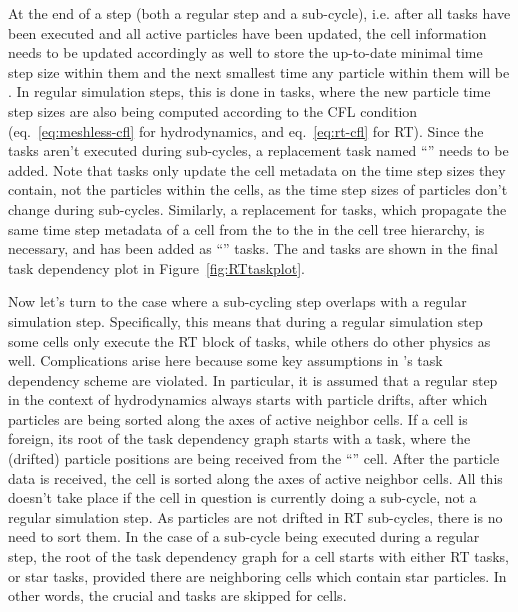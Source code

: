 At the end of a step (both a regular step and a sub-cycle), i.e. after all tasks have been executed
and all active particles have been updated, the cell information needs to be updated accordingly as
well to store the up-to-date minimal time step size within them and the next smallest time any
particle within them will be . In regular simulation steps, this is done in
 tasks, where the new particle time step sizes are also being computed according to
the CFL condition (eq.~\ref{eq:meshless-cfl} for hydrodynamics, and eq.~\ref{eq:rt-cfl} for RT).
Since the  tasks aren't executed during sub-cycles, a replacement task named
``'' needs to be added. Note that 
tasks only update the cell metadata on the time step sizes they contain, not the particles within
the cells, as the time step sizes of particles don't change during sub-cycles. Similarly, a
replacement for  tasks, which propagate the same time step metadata of a cell from
the  to the  in the cell tree hierarchy, is necessary, and has
been added as ``'' tasks. The   and
 tasks are shown in the final task dependency plot in
Figure~\ref{fig:RTtaskplot}.


Now let's turn to the case where a sub-cycling step overlaps with a regular simulation step.
Specifically, this means that during a regular simulation step some cells only execute the RT block
of tasks, while others do other physics as well. Complications arise here because some key
assumptions in \swift's task dependency scheme are violated. In particular, it is assumed that a
regular step in the context of hydrodynamics always starts with particle drifts, after which
particles are being sorted along the axes of active neighbor cells. If a cell is foreign, its root
of the task dependency graph starts with a  task, where the (drifted) particle
positions are being received from the ``'' cell. After the particle data is received,
the cell is sorted along the axes of active neighbor cells. All this doesn't take place if the cell
in question is currently doing a sub-cycle, not a regular simulation step. As particles are not
drifted in RT sub-cycles, there is no need to sort them. In the case of a sub-cycle being executed
during a regular step, the root of the task dependency graph for a cell starts with either RT tasks,
or star tasks, provided there are neighboring cells which contain star particles. In other words,
the crucial  and  tasks are skipped for  cells.

